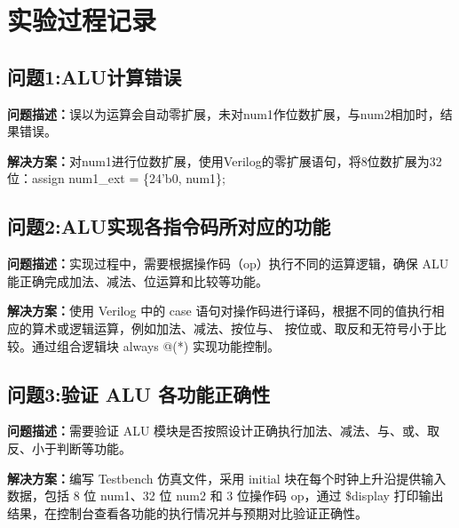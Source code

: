 \section{实验过程记录}

\subsection{问题1:ALU计算错误}
\textbf{问题描述：}误以为运算会自动零扩展，未对num1作位数扩展，与num2相加时，结果错误。

\textbf{解决方案：}对num1进行位数扩展，使用Verilog的零扩展语句，将8位数扩展为32位：assign num1\_ext = \{24'b0, num1\};
\subsection{问题2:ALU实现各指令码所对应的功能}
\textbf{问题描述：}实现过程中，需要根据操作码（op）执行不同的运算逻辑，确保 ALU 能正确完成加法、减法、位运算和比较等功能。

\textbf{解决方案：}使用 Verilog 中的 case 语句对操作码进行译码，根据不同的值执行相应的算术或逻辑运算，例如加法、减法、按位与、
按位或、取反和无符号小于比较。通过组合逻辑块 always @(*) 实现功能控制。
\subsection{问题3:验证 ALU 各功能正确性}
\textbf{问题描述：}需要验证 ALU 模块是否按照设计正确执行加法、减法、与、或、取反、小于判断等功能。

\textbf{解决方案：}编写 Testbench 仿真文件，采用 initial 块在每个时钟上升沿提供输入数据，包括 8 位 num1、32 位 num2
 和 3 位操作码 op，通过 \$display 打印输出结果，在控制台查看各功能的执行情况并与预期对比验证正确性。

